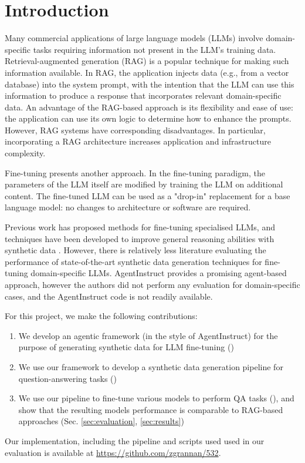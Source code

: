 \section{Introduction}
Many commercial applications of large language models (LLMs) involve
domain-specific tasks requiring information not present in the LLM’s
training data. Retrieval-augmented generation (RAG)
\citep{lewis_retrieval-augmented_2020} is a popular technique for making such
information available. In RAG, the application injects data (e.g., from a
vector database) into the system prompt, with the intention that the LLM can use this
information to produce a response that incorporates relevant domain-specific
data. An advantage of the RAG-based approach is its flexibility and ease of use:
the application can use its own logic to determine how to enhance the prompts.
However, RAG systems have corresponding disadvantages. In particular,
incorporating a RAG architecture increases application and infrastructure
complexity.

Fine-tuning presents another approach. In the fine-tuning paradigm, the
parameters of the LLM itself are modified by training the LLM on additional
content. The fine-tuned LLM can be used as a "drop-in" replacement for a base
language model: no changes to architecture or software are required.

Previous work \citep{balaguer_rag_2024,yang_fingpt_2023,wu_pmc-llama_2023} has
proposed methods for fine-tuning specialised LLMs, and techniques have been
developed to improve general reasoning abilities with synthetic data
\citep{shao_synthetic_2023,wang_self-instruct_2023}. However, there is
relatively less literature evaluating the performance of state-of-the-art
synthetic data generation techniques for fine-tuning domain-specific LLMs.
AgentInstruct \citep{mitra_agentinstruct_2024} provides a promising agent-based
approach, however the authors did not perform any evaluation for domain-specific
cases, and the AgentInstruct code is not readily available.

For this project, we make the following contributions:

\begin{enumerate}
\item We develop an agentic framework (in the style of AgentInstruct) for the purpose
of generating synthetic data for LLM fine-tuning ()
\item We use our framework to develop a synthetic data generation pipeline for question-answering tasks
()
\item We use our pipeline to fine-tune various models to perform QA tasks (), and show that
the resulting models performance is comparable to RAG-based approaches (Sec. \ref{sec:evaluation}, \ref{sec:results})
\end{enumerate}

Our implementation, including the pipeline and scripts used used in our
evaluation is available at \url{https://github.com/zgrannan/532}.

